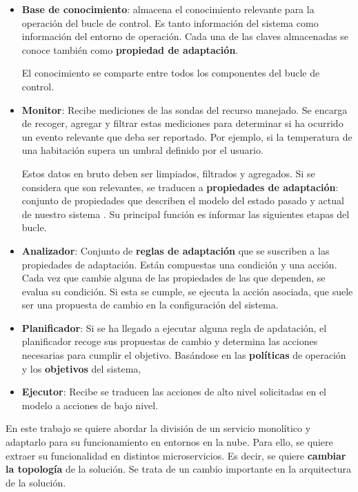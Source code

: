 \begin{itemize}
  \item \textbf{Base de conocimiento}: almacena el conocimiento relevante para la operación del bucle de control. Es tanto información del sistema como información del entorno de operación. Cada una de las claves almacenadas se conoce también como \textbf{propiedad de adaptación}.

  El conocimiento se comparte entre todos los componentes del bucle de control.

  \item \textbf{Monitor}: Recibe mediciones de las sondas del recurso manejado. Se encarga de recoger, agregar y filtrar estas mediciones para determinar si ha ocurrido un evento relevante que deba ser reportado. Por ejemplo, si la temperatura de una habitación supera un umbral definido por el usuario.

  Estos datos en bruto deben ser limpiados, filtrados y agregados. Si se considera que son relevantes, se traducen a \textbf{propiedades de adaptación}: conjunto de propiedades que describen el modelo del estado pasado y actual de nuestro sistema \cite{garlanIncreasingSystemDependability2003}. Su principal función es informar las siguientes etapas del bucle.


  \item \textbf{Analizador}: Conjunto de \textbf{reglas de adaptación} que se suscriben a las propiedades de adaptación. Están compuestas una condición y una acción. Cada vez que cambie alguna de las propiedades de las que dependen, se evalua su condición. Si esta se cumple, se ejecuta la acción asociada, que suele ser una propuesta de cambio en la configuración del sistema.

  \item \textbf{Planificador}: Si se ha llegado a ejecutar alguna regla de apdatación, el planificador recoge sus propuestas de cambio y determina las acciones necesarias para cumplir el objetivo. Basándose en las \textbf{políticas} de operación y los \textbf{objetivos} del sistema,

  \item \textbf{Ejecutor}: Recibe se traducen las acciones de alto nivel solicitadas en el modelo a acciones de bajo nivel.
\end{itemize}


En este trabajo se quiere abordar la división de un servicio monolítico y adaptarlo para su funcionamiento en entornos en la nube. Para ello, se quiere extraer su funcionalidad en distintos microservicios. Es decir, se quiere \textbf{cambiar la topología} de la solución. Se trata de un cambio importante en la arquitectura de la solución.

